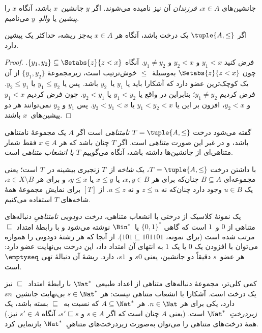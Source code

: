 \documentclass[../../../include/open-logic-section]{subfiles}
\begin{document}
جانشین‌های $x \in A$، \emph{فرزندان} آن نیز نامیده می‌شوند. اگر
$y$ جانشین~$x$ باشد، آنگاه $x$ را \emph{پیشین} یا \emph{والدِ}~$y$
می‌نامیم.

\begin{prop}
اگر $\tuple{A,\le}$ یک درخت باشد، آنگاه هر $x \in A$ به‌جز ریشه،
حداکثر یک پیشین دارد.
\end{prop}

\begin{proof}
  فرض کنید $y_1 < x$ و $y_2 < x$ و $y_1 \neq y_2$. آنگاه $\{y_1,
  y_2\} \subseteq \Setabs{z}{z<x}$. چون $\Setabs{z}{z<x}$
  به‌وسیلهٔ~$\le$ خوش‌ترتیب است، زیرمجموعهٔ $\{y_1, y_2\}$ از آن یک
  کوچک‌ترین عضو دارد که آشکارا باید یا $y_1$ یا~$y_2$ باشد. پس یا
  $y_1 \le y_2$ یا $y_2 \le y_1$. فرض کردیم $y_1 \neq y_2$؛ بنابراین
  در واقع یا $y_1 < y_2$ یا $y_2 < y_1$. چون فرض کردیم $y_1 < x$ و
  $y_2 < x$، افزون بر این یا $y_1 < y_2
  < x$ یا $y_2 < y_1 < x$. پس $y_1$ و $y_2$ نمی‌توانند هر دو
  پیشین‌های~$x$ باشند.
\end{proof}

\begin{defn}
گفته می‌شود درخت $T = \tuple{A, \le}$ \emph{نامتناهی} است اگر $A$ یک
مجموعهٔ نامتناهی باشد، و در غیر این صورت \emph{متناهی} است. اگر $T$
چنان باشد که هر $x \in A$ فقط شمار متناهی‌ای از جانشین‌ها داشته باشد، آنگاه
می‌گوییم $T$ \emph{با انشعاب متناهی} است.
\end{defn}

\begin{defn}[شاخه‌ها]
با داشتن درخت $T = \tuple{A, \le}$، یک \emph{شاخه} از~$T$ زنجیری
بیشینه در~$T$ است؛ یعنی مجموعه‌ای $B \subseteq A$ چنان‌که برای هر
$x, y \in B$، یا $x \le y$ یا $y \le x$، و برای هر
$z \in X \setminus B$، یک $u \in B$ وجود دارد چنان‌که نه
$z \le u$ و نه $u \le z$.
%
از $[T]$ برای نمایش مجموعهٔ همهٔ شاخه‌های $T$ استفاده می‌کنیم.
\end{defn}

\begin{ex}
یک نمونهٔ کلاسیک از درختی با انشعاب متناهی، \emph{درخت دودویی
نامتناهیِ} دنباله‌های متناهی از $0$ و~$1$ است که گاهی
$\{0,1\}^*$ یا~$\Bin^*$ نوشته می‌شود و با رابطهٔ امتداد $\sqsubseteq$
مرتب شده است (برای نمونه، $101 \sqsubseteq 101101$).
از آنجا که هر رشتهٔ دودویی را همواره می‌توان با افزودن
یک $0$ یا یک $1$ به انتهای آن امتداد داد، این درخت بی‌نهایت
عضو دارد: هر عضو~$s$ دقیقاً دو جانشین، یعنی $s0$ و~$s1$، دارد. ریشهٔ آن
دنبالهٔ تهی $\emptyseq$ است.
\end{ex}

\begin{ex}
کمی کلی‌تر، مجموعهٔ دنباله‌های متناهی از اعداد طبیعی~$\Nat^*$ با
رابطهٔ امتداد~$\sqsubseteq$ نیز یک درخت است. آشکارا با انشعاب متناهی
نیست: هر $s \in \Nat^*$ بی‌نهایت جانشین~$sn$ دارد، یکی برای هر
$n \in \Nat$. هر $A
\subseteq \Nat^*$ که نسبت به~$\sqsubseteq$ بسته باشد، یک
\emph{زیردرختِ}~$\Nat^*$ است. (یعنی $A$ چنان است که اگر $s \in A$
و $s' \sqsubseteq s$، آنگاه $s' \in A$ نیز.) همهٔ درخت‌های متناهی را
می‌توان به‌صورت زیردرخت‌های متناهیِ~$\Nat^*$ بازنمایی کرد.
\end{ex}
\end{document}
